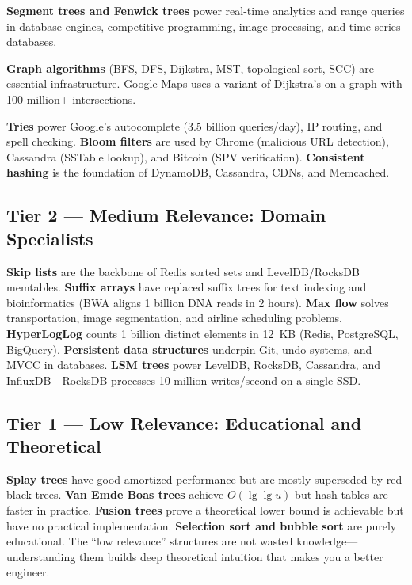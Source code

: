 \textbf{Segment trees and Fenwick trees} power real-time analytics and range queries in database engines, competitive programming, image processing, and time-series databases.

\textbf{Graph algorithms} (BFS, DFS, Dijkstra, MST, topological sort, SCC) are essential infrastructure. Google Maps uses a variant of Dijkstra's on a graph with 100 million+ intersections.

\textbf{Tries} power Google's autocomplete (3.5 billion queries/day), IP routing, and spell checking. \textbf{Bloom filters} are used by Chrome (malicious URL detection), Cassandra (SSTable lookup), and Bitcoin (SPV verification). \textbf{Consistent hashing} is the foundation of DynamoDB, Cassandra, CDNs, and Memcached.

\subsection{Tier 2 --- Medium Relevance: Domain Specialists}

\textbf{Skip lists} are the backbone of Redis sorted sets and LevelDB/RocksDB memtables. \textbf{Suffix arrays} have replaced suffix trees for text indexing and bioinformatics (BWA aligns 1 billion DNA reads in 2 hours). \textbf{Max flow} solves transportation, image segmentation, and airline scheduling problems. \textbf{HyperLogLog} counts 1 billion distinct elements in 12~KB (Redis, PostgreSQL, BigQuery). \textbf{Persistent data structures} underpin Git, undo systems, and MVCC in databases. \textbf{LSM trees} power LevelDB, RocksDB, Cassandra, and InfluxDB---RocksDB processes 10 million writes/second on a single SSD.

\subsection{Tier 1 --- Low Relevance: Educational and Theoretical}

\textbf{Splay trees} have good amortized performance but are mostly superseded by red-black trees. \textbf{Van Emde Boas trees} achieve $O(\lg \lg u)$ but hash tables are faster in practice. \textbf{Fusion trees} prove a theoretical lower bound is achievable but have no practical implementation. \textbf{Selection sort and bubble sort} are purely educational. The ``low relevance'' structures are not wasted knowledge---understanding them builds deep theoretical intuition that makes you a better engineer.


